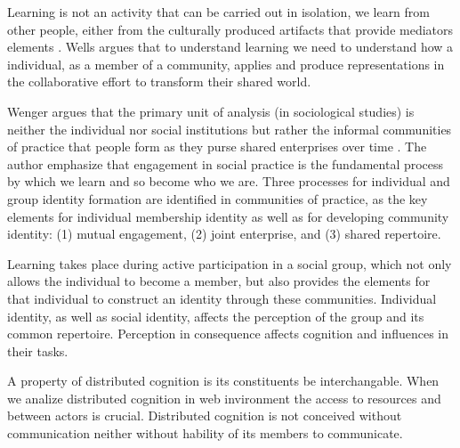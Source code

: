 \documentclass[10pt,twocolumn,ieeetran]{article}
\begin{document}






Learning is not an activity that can be carried out in isolation, we learn from other people, either from the culturally produced artifacts that provide mediators elements \cite{Wells}. Wells \cite{Wells} argues that to understand learning we need to understand how a individual, as a member of a community, applies and produce representations in the collaborative effort to transform their shared world.



Wenger \cite{Wenger} argues that the primary unit of analysis (in sociological studies) is neither the individual nor social institutions but rather the informal communities of practice that people form as they purse shared enterprises over time \cite{Wenger}. The author emphasize that engagement in social practice is the fundamental process by which we learn and so become who we are. Three processes for individual and group identity formation are identified in communities of practice, as the key elements for individual membership identity as well as for developing community identity: (1) mutual engagement, (2) joint enterprise, and
(3) shared repertoire.


Learning takes place during active participation in a social group, which not only allows the individual to become a member, but also provides the elements for that individual to construct an identity through these communities. Individual identity, as well as social identity, affects the perception of the group and its common repertoire. Perception in consequence affects cognition and influences in their tasks.


A property of distributed cognition is its constituents be interchangable. When we analize distributed
cognition in web invironment the access to resources and between actors is crucial. Distributed cognition
is not conceived without communication neither without hability of its members to communicate.
\end{document}
